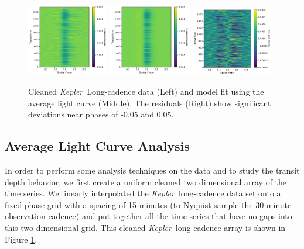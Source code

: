 \documentclass[preprint,trackchanges]{aastex61}
\newcommand{\kepler}{{\it Kepler}}
\begin{document}
\begin{figure}[!hbtp]
\begin{centering}
\includegraphics[width=0.32\textwidth]{photometry_riverplot.pdf}
\includegraphics[width=0.32\textwidth]{model_riverplot.pdf}
\includegraphics[width=0.32\textwidth]{residual_riverplot.pdf}
\caption{Cleaned \kepler\ Long-cadence data (Left) and model fit using the average light curve (Middle).
The residuals (Right) show significant deviations near phases of -0.05 and 0.05.
}\label{fig:riverPlots}
\end{centering}
\end{figure}

\subsection{Average Light Curve Analysis}

In order to perform some analysis techniques on the data and to study the transit depth behavior, we first create a uniform cleaned two dimensional array of the time series.
We linearly interpolated the \kepler\ long-cadence data set onto a fixed phase grid with a spacing of 15 minutes (to Nyquist sample the 30 minute observation cadence) and put together all the time series that have no gaps into this two dimensional grid.
This cleaned \kepler\ long-cadence array is shown in Figure \ref{fig:riverPlots}.
\end{document}
